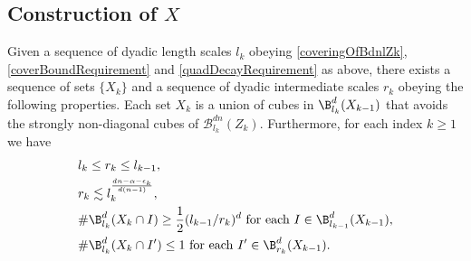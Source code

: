 \subsection{Construction of $X$} 
\begin{lemma} 
Given a sequence of dyadic length scales $l_k$ obeying \eqref{coveringOfBdnlZk}, \eqref{coverBoundRequirement} and \eqref{quadDecayRequirement} as above, there exists a sequence of sets $\{X_k\}$ and a sequence of dyadic intermediate scales $r_k$ obeying the following properties. Each set $X_k$ is a union of cubes in $\B_{l_k}^d(X_{k-1})$ that avoids the strongly non-diagonal cubes of $\mathcal B_{l_k}^{dn}(Z_k)$. Furthermore, for each index $k\geq 1$ we have
\begin{align}
& l_k\leq r_k\leq l_{k-1},\\
& r_k \lesssim l_{k}^{\frac{dn-\alpha -\epsilon_k}{d(n-1)}},\label{rkSizeBound}\\
& \# \B^d_{l_k}(X_k \cap I) \geq \frac{1}{2}(l_{k-1}/r_k)^d  \text{ for each}\ I\in \B_{l_{k-1}}^d(X_{k-1}), \label{manyIkInIkm1}\\
&\# \B^d_{l_k}(X_k \cap I') \leq 1 \text{ for each}\ I' \in \B_{r_{k}}^d(X_{k-1}).\label{XkWellDistributed}
\end{align}
\end{lemma} 
